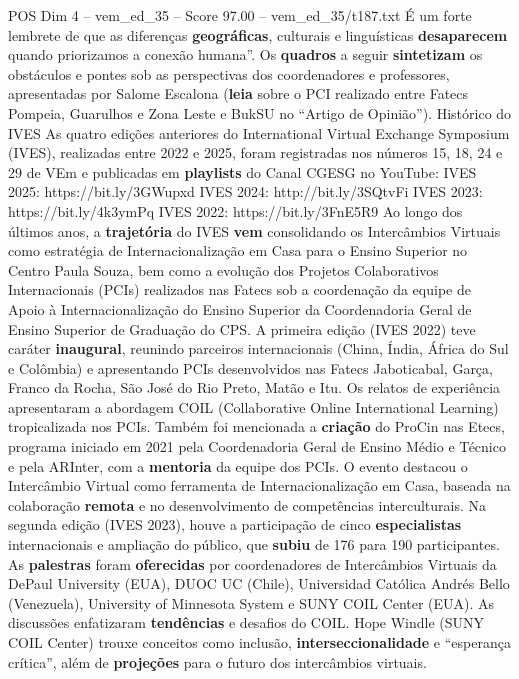 \begin{textsample}{POS Dim 4 – vem\_ed\_35 – Score 97.00 – vem\_ed\_35/t187.txt}
É um forte lembrete de que as diferenças \textbf{geográficas}, culturais e linguísticas \textbf{desaparecem} quando priorizamos a conexão humana”.
Os \textbf{quadros} a seguir \textbf{sintetizam} os obstáculos e pontes sob as perspectivas dos coordenadores e professores, apresentadas por Salome Escalona (\textbf{leia} sobre o PCI realizado entre Fatecs Pompeia, Guarulhos e Zona Leste e BukSU no “Artigo de Opinião”).
Histórico do IVES As quatro edições anteriores do International Virtual Exchange Symposium (IVES), realizadas entre 2022 e 2025, foram registradas nos números 15, 18, 24 e 29 de VEm e publicadas em \textbf{playlists} do Canal CGESG no YouTube: IVES 2025: https://bit.ly/3GWupxd IVES 2024: http://bit.ly/3SQtvFi IVES 2023: https://bit.ly/4k3ymPq IVES 2022: https://bit.ly/3FnE5R9 Ao longo dos últimos anos, a \textbf{trajetória} do IVES \textbf{vem} consolidando os Intercâmbios Virtuais como estratégia de Internacionalização em Casa para o Ensino Superior no Centro Paula Souza, bem como a evolução dos Projetos Colaborativos Internacionais (PCIs) realizados nas Fatecs sob a coordenação da equipe de Apoio à Internacionalização do Ensino Superior da Coordenadoria Geral de Ensino Superior de Graduação do CPS.
A primeira edição (IVES 2022) teve caráter \textbf{inaugural}, reunindo parceiros internacionais (China, Índia, África do Sul e Colômbia) e apresentando PCIs desenvolvidos nas Fatecs Jaboticabal, Garça, Franco da Rocha, São José do Rio Preto, Matão e Itu.
Os relatos de experiência apresentaram a abordagem COIL (Collaborative Online International Learning) tropicalizada nos PCIs.
Também foi mencionada a \textbf{criação} do ProCin nas Etecs, programa iniciado em 2021 pela Coordenadoria Geral de Ensino Médio e Técnico e pela ARInter, com a \textbf{mentoria} da equipe dos PCIs.
O evento destacou o Intercâmbio Virtual como ferramenta de Internacionalização em Casa, baseada na colaboração \textbf{remota} e no desenvolvimento de competências interculturais.
Na segunda edição (IVES 2023), houve a participação de cinco \textbf{especialistas} internacionais e ampliação do público, que \textbf{subiu} de 176 para 190 participantes.
As \textbf{palestras} foram \textbf{oferecidas} por coordenadores de Intercâmbios Virtuais da DePaul University (EUA), DUOC UC (Chile), Universidad Católica Andrés Bello (Venezuela), University of Minnesota System e SUNY COIL Center (EUA).
As discussões enfatizaram \textbf{tendências} e desafios do COIL.
Hope Windle (SUNY COIL Center) trouxe conceitos como inclusão, \textbf{interseccionalidade} e “esperança crítica”, além de \textbf{projeções} para o futuro dos intercâmbios virtuais.

\end{textsample}
